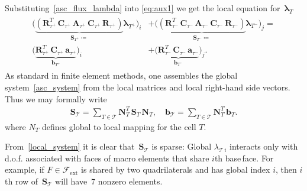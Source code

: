 \documentclass[12pt]{article}
\newcommand{\vect}[1]{\boldsymbol{\mathbf{#1}}}
\newcommand{\bcell}{T}
\newcommand{\bmesh}{{\vect{\mathcal T}}}
\newcommand{\mmesh}{{\vect{\mathcal \tau}}}
\newcommand{\bfaces}[1][]{{\vect{\mathcal F}_{\text{#1}}}}
\begin{document}
Substituting~\eqref{asc_flux_lambda} into \eqref{eq:aux1} we get the local equation for~${\vect \lambda}_\bcell$
	\begin{align}\label{local_system}
		\begin{split}
			\Big( \underbrace{\left( \vect R^T_{\mmesh^+}\,\vect C_{\mmesh^+}\,\vect A_{\mmesh^+}\,\vect C_{\mmesh^+}\,\vect R_{\mmesh^+} \right)}_{\vect S_{\bcell^+} \coloneqq} {\vect \lambda}_{\bcell^+} \Big)_i
			&+
			\Big( \underbrace{\left( \vect R^T_{\mmesh^-}\,\vect C_{\mmesh^-}\,\vect A_{\mmesh^-}\,\vect C_{\mmesh^-}\,\vect R_{\mmesh^-} \right)}_{\vect S_{\bcell^-} \coloneqq} {\vect \lambda}_{\bcell^-} \Big)_j = \\
			\big( \underbrace{\vect R^T_{\mmesh^+}\,\vect C_{\mmesh^+}\,{\vect a}_{\mmesh^+}}_{{\vect b}_{\bcell^+}} \big)_i
			&+
			\big( \underbrace{\vect R^T_{\mmesh^-}\,\vect C_{\mmesh^-}\,{\vect a}_{\mmesh^-}}_{{\vect b}_{\bcell^-}} \big)_j.
		\end{split}
	\end{align}
As standard in finite element methods, one assembles the global system~\eqref{asc_system} from the local matrices and local right-hand side vectors.  Thus we may formally write
	\begin{align}\label{global_system_assembly}
			\vect S_\bmesh = \sum_{\bcell \in \bmesh} \vect N^T_\bcell\,\vect S_\bcell\,\vect N_\bcell, \quad
			{\vect b}_\bmesh = \sum_{\bcell \in \bmesh} \vect N^T_\bcell\,{\vect b}_\bcell.
	\end{align}
where $N_\bcell$ defines global to local mapping for the cell $T$.

From~\eqref{local_system} it is clear that~$\vect S_\bmesh$ is sparse: Global  $\lambda_{\bmesh\,i}$ interacts only with d.o.f. associated with faces of macro elements that share $i$th base\,face. For example, if $F\in\bfaces[ext]$ is shared by two quadrilaterals and has global index $i$, then $i$th row of~$\vect S_\bmesh$ will have~7 nonzero elements. %
\end{document}

